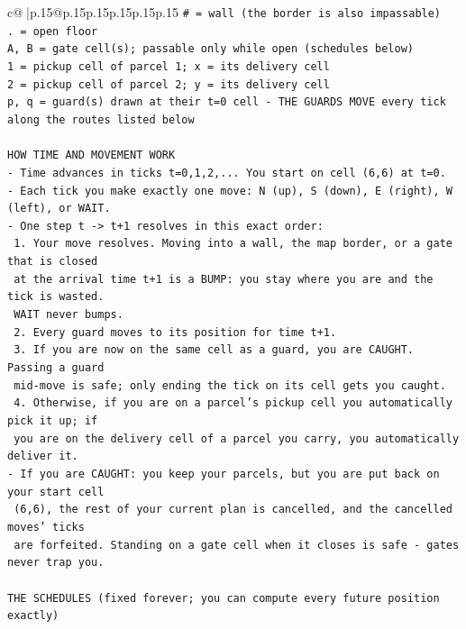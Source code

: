 \documentclass{article}
\begin{document}
{\begin{supertabular}{c@{$\;$}|p{.15\linewidth}@{}p{.15\linewidth}p{.15\linewidth}p{.15\linewidth}p{.15\linewidth}p{.15\linewidth}}
{{{\texttt{\# = wall (the border is also impassable)} \\
\texttt{. = open floor} \\
\texttt{A, B = gate cell(s); passable only while open (schedules below)} \\
\texttt{1 = pickup cell of parcel 1; x = its delivery cell} \\
\texttt{2 = pickup cell of parcel 2; y = its delivery cell} \\
\texttt{p, q = guard(s) drawn at their t=0 cell {-} THE GUARDS MOVE every tick along the routes listed below} \\
\\ 
\texttt{HOW TIME AND MOVEMENT WORK} \\
\texttt{{-} Time advances in ticks t=0,1,2,... You start on cell (6,6) at t=0.} \\
\texttt{{-} Each tick you make exactly one move: N (up), S (down), E (right), W (left), or WAIT.} \\
\texttt{{-} One step t {-}> t+1 resolves in this exact order:} \\
\texttt{  1. Your move resolves. Moving into a wall, the map border, or a gate that is closed} \\
\texttt{     at the arrival time t+1 is a BUMP: you stay where you are and the tick is wasted.} \\
\texttt{     WAIT never bumps.} \\
\texttt{  2. Every guard moves to its position for time t+1.} \\
\texttt{  3. If you are now on the same cell as a guard, you are CAUGHT. Passing a guard} \\
\texttt{     mid{-}move is safe; only ending the tick on its cell gets you caught.} \\
\texttt{  4. Otherwise, if you are on a parcel's pickup cell you automatically pick it up; if} \\
\texttt{     you are on the delivery cell of a parcel you carry, you automatically deliver it.} \\
\texttt{{-} If you are CAUGHT: you keep your parcels, but you are put back on your start cell} \\
\texttt{  (6,6), the rest of your current plan is cancelled, and the cancelled moves' ticks} \\
\texttt{  are forfeited. Standing on a gate cell when it closes is safe {-} gates never trap you.} \\
\\ 
\texttt{THE SCHEDULES (fixed forever; you can compute every future position exactly)} \\
}}}
\end{supertabular}}
\end{document}
